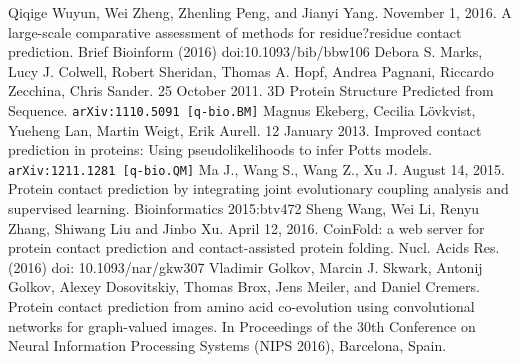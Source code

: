 \documentclass{article}
\begin{document}
\begin{thebibliography}{9}
{\setlength\itemsep{0.0em}
	Qiqige Wuyun, Wei Zheng, Zhenling Peng, and Jianyi Yang. November 1, 2016. A large-scale comparative assessment of methods for residue?residue contact prediction. Brief Bioinform (2016) doi:10.1093/bib/bbw106
	Debora S. Marks, Lucy J. Colwell, Robert Sheridan, Thomas A. Hopf, Andrea Pagnani, Riccardo Zecchina, Chris Sander. 25 October 2011. 3D Protein Structure Predicted from Sequence. {\tt arXiv:1110.5091 [q-bio.BM]}
	Magnus Ekeberg, Cecilia L{\"o}vkvist, Yueheng Lan, Martin Weigt, Erik Aurell. 12 January 2013. Improved contact prediction in proteins: Using pseudolikelihoods to infer Potts models. {\tt arXiv:1211.1281 [q-bio.QM]}
	 Ma J., Wang S., Wang Z., Xu J. August 14, 2015. Protein contact prediction by integrating joint evolutionary coupling analysis and supervised learning. Bioinformatics 2015:btv472
	Sheng Wang,  Wei Li, Renyu Zhang, Shiwang Liu and Jinbo Xu. April 12, 2016. CoinFold: a web server for protein contact prediction and contact-assisted protein folding. Nucl. Acids Res. (2016) doi: 10.1093/nar/gkw307
	Vladimir Golkov, Marcin J. Skwark, Antonij Golkov, Alexey Dosovitskiy, Thomas Brox, Jens Meiler, and Daniel Cremers. Protein contact prediction from amino acid co-evolution using convolutional networks for graph-valued images. In Proceedings of the 30th Conference on Neural Information Processing Systems (NIPS 2016), Barcelona, Spain.
}
\end{thebibliography}
\end{document}
